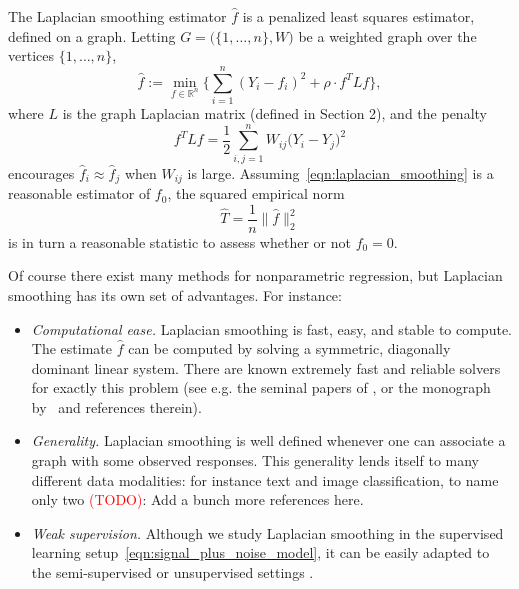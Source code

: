 \documentclass[twoside]{article}
\newcommand{\Reals}{\mathbb{R}}
\newcommand{\1}{\mathbf{1}}
\newcommand{\Lap}{L}
\newcommand{\wh}[1]{\widehat{#1}}
\theoremstyle{definition}
\theoremstyle{remark}
\begin{document}
The Laplacian smoothing estimator $\wh{f}$ \citep{smola2003} is a penalized least squares estimator, defined on a graph. Letting $G = \bigl(\{1,\ldots,n\},W\bigr)$ be a weighted graph over the vertices $\{1,\ldots,n\}$, 
\begin{equation}
\label{eqn:laplacian_smoothing}
\wh{f} :=  \min_{f \in \Reals^n} \biggl\{\sum_{i = 1}^{n}(Y_i - f_i)^2 + \rho \cdot f^T \Lap f \biggr\},
\end{equation}
where $\Lap$ is the graph Laplacian matrix (defined in Section 2), and the penalty
\begin{equation*}
f^T \Lap f = \frac{1}{2} \sum_{i,j = 1}^{n} W_{ij}\bigl(Y_i - Y_j\bigr)^2
\end{equation*}
encourages $\wh{f}_i \approx \wh{f}_j$ when $W_{ij}$ is large. Assuming~\eqref{eqn:laplacian_smoothing} is a reasonable estimator of $f_0$, the squared empirical norm
\begin{equation}
\label{eqn:laplacian_smoothing_test}
\wh{T} = \frac{1}{n}\bigl\|\wh{f}\bigr\|_2^2 
\end{equation}
is in turn a reasonable statistic to assess whether or not $f_0 = 0$. 

Of course there exist many methods for nonparametric regression, but Laplacian smoothing has its own set of advantages. For instance:
\begin{itemize}
	\item \emph{Computational ease.} Laplacian smoothing is fast, easy, and stable to compute. The estimate $\wh{f}$ can be computed by solving a symmetric, diagonally dominant linear system. There are known extremely fast and reliable solvers for exactly this problem (see e.g. the seminal papers of \cite{spielman2011,spielman2013,spielman2014}, or the monograph by~\cite{vishnoi2012} and references therein).
	\item \emph{Generality.} Laplacian smoothing is well defined whenever one can associate a graph with some observed responses. This generality lends itself to many different data modalities: for instance text and image classification, to name only two \citep{kondor2002, belkin03a,belkin2006} \textcolor{red}{(TODO)}: Add a bunch more references here.
	\item \emph{Weak supervision.} Although we study Laplacian smoothing in the supervised learning setup~\eqref{eqn:signal_plus_noise_model}, it can be easily adapted to the semi-supervised or unsupervised settings \citep{nadler09,slepcev17,dunlop2020,calder2019b}.
\end{itemize}
\end{document}
